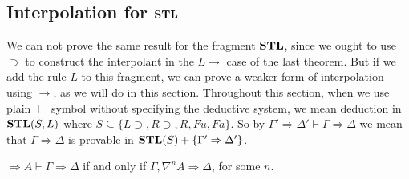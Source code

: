 \subsection{Interpolation for $\mathbf{STL}$}
We can not prove the same result for the fragment $\mathbf{STL}$, since we ought to use $\supset$ to construct the interpolant in the  $L\rightarrow$ case of the last theorem. But if we add the rule $L$ to this fragment, we can prove a weaker form of interpolation using $\rightarrow$, as we will do in this section.
Throughout this section, when we use plain $\vdash$ symbol without specifying the deductive system, we mean deduction in $\mathbf{STL}(S, L)$ where $S \subseteq \{L\supset, R\supset, R, Fu, Fa\}$. So by $\Gamma' \Rightarrow \Delta' \vdash \Gamma \Rightarrow \Delta$ we mean that $\Gamma \Rightarrow \Delta$ is provable in $\mathbf{STL}(S)+\{\Gamma' \Rightarrow \Delta'\}$.
\begin{lem}
	\label{lem:vdash} $\Rightarrow A \vdash \Gamma \Rightarrow \Delta$ if and only if $\Gamma, \nabla^n A \Rightarrow \Delta$, for some $n$.
\end{lem}
